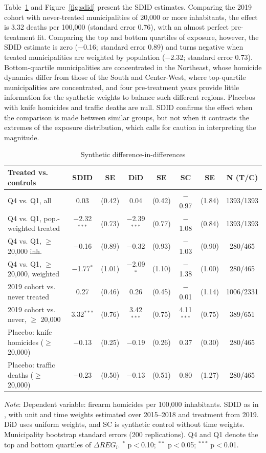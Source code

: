 \documentclass[11pt,a4paper]{article}
\newcommand{\nota}[1]{\par\vspace{2pt}\begin{minipage}{\linewidth}\footnotesize\textit{Note}: #1\end{minipage}}
\begin{document}
Table~\ref{tab:sdid} and Figure~\ref{fig:sdid} present the SDID estimates. Comparing the 2019 cohort with never-treated municipalities of 20,000 or more inhabitants, the effect is 3.32 deaths per 100,000 (standard error 0.76), with an almost perfect pre-treatment fit. Comparing the top and bottom quartiles of exposure, however, the SDID estimate is zero ($-$0.16; standard error 0.89) and turns negative when treated municipalities are weighted by population ($-$2.32; standard error 0.73). Bottom-quartile municipalities are concentrated in the Northeast, whose homicide dynamics differ from those of the South and Center-West, where top-quartile municipalities are concentrated, and four pre-treatment years provide little information for the synthetic weights to balance such different regions. Placebos with knife homicides and traffic deaths are null. SDID confirms the effect when the comparison is made between similar groups, but not when it contrasts the extremes of the exposure distribution, which calls for caution in interpreting the magnitude.

\begin{table}[H]
\centering\footnotesize\setlength{\tabcolsep}{4pt}
\caption{Synthetic difference-in-differences}\label{tab:sdid}
\begin{tabular}{lccccccc}
\toprule
Treated vs. controls & SDID & SE & DiD & SE & SC & SE & N (T/C) \\
\midrule
Q4 vs. Q1, all & 0.03 & (0.42) & 0.04 & (0.42) & $-$0.97 & (1.84) & 1393/1393 \\
Q4 vs. Q1, pop.-weighted treated & $-$2.32$^{***}$ & (0.73) & $-$2.39$^{***}$ & (0.77) & $-$1.08 & (0.84) & 1393/1393 \\
Q4 vs. Q1, $\geq$ 20,000 inh. & $-$0.16 & (0.89) & $-$0.32 & (0.93) & $-$1.03 & (0.90) & 280/465 \\
Q4 vs. Q1, $\geq$ 20,000, weighted & $-$1.77$^{*}$ & (1.01) & $-$2.09$^{*}$ & (1.10) & $-$1.38 & (1.00) & 280/465 \\
2019 cohort vs. never treated & 0.27 & (0.46) & 0.26 & (0.45) & $-$0.01 & (1.14) & 1006/2331 \\
2019 cohort vs. never, $\geq$ 20,000 & 3.32$^{***}$ & (0.76) & 3.42$^{***}$ & (0.75) & 4.11$^{***}$ & (0.75) & 389/651 \\
\midrule
Placebo: knife homicides ($\geq$ 20,000) & $-$0.13 & (0.25) & $-$0.19 & (0.26) & 0.37 & (0.30) & 280/465 \\
Placebo: traffic deaths ($\geq$ 20,000) & $-$0.23 & (0.50) & $-$0.13 & (0.51) & 0.80 & (1.27) & 280/465 \\
\bottomrule
\end{tabular}
\nota{Dependent variable: firearm homicides per 100,000 inhabitants. SDID as in \citet{arkhangelsky2021}, with unit and time weights estimated over 2015--2018 and treatment from 2019. DiD uses uniform weights, and SC is synthetic control without time weights. Municipality bootstrap standard errors (200 replications). Q4 and Q1 denote the top and bottom quartiles of $\Delta REG_i$. $^{*}$ p$<$0.10; $^{**}$ p$<$0.05; $^{***}$ p$<$0.01.}
\end{table}
\end{document}
